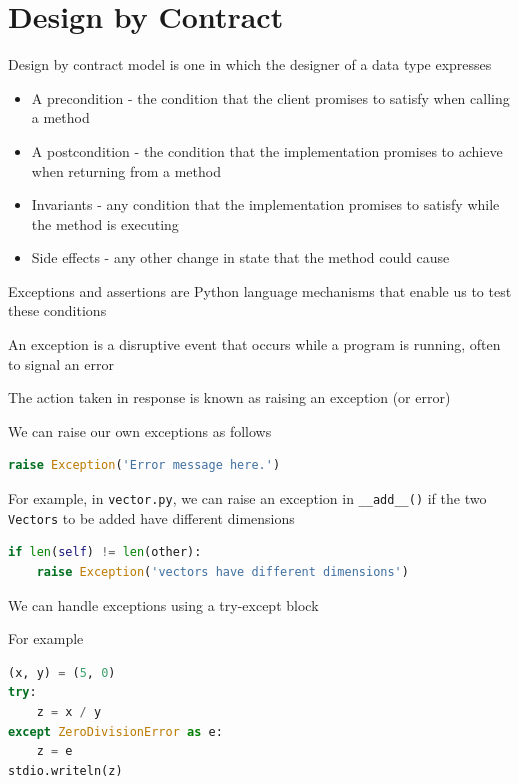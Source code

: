 \documentclass[8pt,a4paper,compress]{beamer}
\begin{document}
\section{Design by Contract}
\begin{frame}[fragile]
\pause

Design by contract model is one in which the designer of a data type expresses
\begin{itemize}
\pause
\item A precondition - the condition that the client promises to satisfy when calling a method
\pause
\item A postcondition - the condition that the implementation promises to achieve when returning from a method
\pause
\item Invariants - any condition that the implementation promises to satisfy while the method is executing 
\pause
\item Side effects - any other change in state that the method could cause
\end{itemize}

\pause
\bigskip

Exceptions and assertions are Python language mechanisms that enable us to test these conditions
\end{frame}

\begin{frame}[fragile]
\pause

An exception is a disruptive event that occurs while a program is running, often to signal an error

\pause
\bigskip

The action taken in response is known as raising an exception (or error)

\pause
\bigskip

We can raise our own exceptions as follows
\begin{lstlisting}[language=Python,style=focusin]
raise Exception('Error message here.')
\end{lstlisting} 

\pause
\bigskip

For example, in \lstinline{vector.py}, we can raise an exception in \lstinline{__add__()} if the two \lstinline{Vectors} to be added have different dimensions
\begin{lstlisting}[language=Python,style=focusin]
if len(self) != len(other):
    raise Exception('vectors have different dimensions')
\end{lstlisting} 

\pause
\bigskip

We can handle exceptions using a try-except block

\pause
\bigskip

For example
\begin{lstlisting}[language=Python,style=focusin]
(x, y) = (5, 0)
try:
    z = x / y
except ZeroDivisionError as e:
    z = e
stdio.writeln(z)
\end{lstlisting} 
\end{frame}
\end{document}
